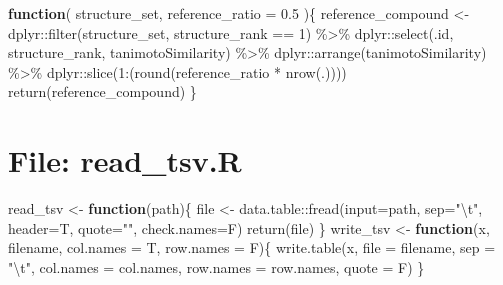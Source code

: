 \documentclass[
]{article}
\newenvironment{Shaded}{\begin{snugshade}}{\end{snugshade}}
\newcommand{\AttributeTok}[1]{\textcolor[rgb]{0.77,0.63,0.00}{#1}}
\newcommand{\ControlFlowTok}[1]{\textcolor[rgb]{0.13,0.29,0.53}{\textbf{#1}}}
\newcommand{\DecValTok}[1]{\textcolor[rgb]{0.00,0.00,0.81}{#1}}
\newcommand{\FloatTok}[1]{\textcolor[rgb]{0.00,0.00,0.81}{#1}}
\newcommand{\FunctionTok}[1]{\textcolor[rgb]{0.00,0.00,0.00}{#1}}
\newcommand{\NormalTok}[1]{#1}
\newcommand{\OtherTok}[1]{\textcolor[rgb]{0.56,0.35,0.01}{#1}}
\newcommand{\SpecialCharTok}[1]{\textcolor[rgb]{0.00,0.00,0.00}{#1}}
\newcommand{\StringTok}[1]{\textcolor[rgb]{0.31,0.60,0.02}{#1}}
\begin{document}
\begin{Shaded}
\begin{Highlighting}[]
  \ControlFlowTok{function}\NormalTok{(}
\NormalTok{           structure\_set,}
           \AttributeTok{reference\_ratio =} \FloatTok{0.5}
\NormalTok{           )\{}
\NormalTok{    reference\_compound }\OtherTok{\textless{}{-}}\NormalTok{ dplyr}\SpecialCharTok{::}\FunctionTok{filter}\NormalTok{(structure\_set, structure\_rank }\SpecialCharTok{==} \DecValTok{1}\NormalTok{) }\SpecialCharTok{\%\textgreater{}\%} 
\NormalTok{      dplyr}\SpecialCharTok{::}\FunctionTok{select}\NormalTok{(.id, structure\_rank, tanimotoSimilarity) }\SpecialCharTok{\%\textgreater{}\%} 
\NormalTok{      dplyr}\SpecialCharTok{::}\FunctionTok{arrange}\NormalTok{(tanimotoSimilarity) }\SpecialCharTok{\%\textgreater{}\%} 
\NormalTok{      dplyr}\SpecialCharTok{::}\FunctionTok{slice}\NormalTok{(}\DecValTok{1}\SpecialCharTok{:}\NormalTok{(}\FunctionTok{round}\NormalTok{(reference\_ratio }\SpecialCharTok{*} \FunctionTok{nrow}\NormalTok{(.))))}
    \FunctionTok{return}\NormalTok{(reference\_compound)}
\NormalTok{  \}}
\end{Highlighting}
\end{Shaded}

\hypertarget{file-read_tsv.r}{%
\section{File: read\_tsv.R}\label{file-read_tsv.r}}

\begin{Shaded}
\begin{Highlighting}[]
\NormalTok{read\_tsv }\OtherTok{\textless{}{-}} \ControlFlowTok{function}\NormalTok{(path)\{}
\NormalTok{  file }\OtherTok{\textless{}{-}}\NormalTok{ data.table}\SpecialCharTok{::}\FunctionTok{fread}\NormalTok{(}\AttributeTok{input=}\NormalTok{path, }\AttributeTok{sep=}\StringTok{"}\SpecialCharTok{\textbackslash{}t}\StringTok{"}\NormalTok{, }\AttributeTok{header=}\NormalTok{T, }\AttributeTok{quote=}\StringTok{""}\NormalTok{, }\AttributeTok{check.names=}\NormalTok{F)}
  \FunctionTok{return}\NormalTok{(file)}
\NormalTok{\}}
\NormalTok{write\_tsv }\OtherTok{\textless{}{-}}
  \ControlFlowTok{function}\NormalTok{(x, filename, }\AttributeTok{col.names =}\NormalTok{ T, }\AttributeTok{row.names =}\NormalTok{ F)\{}
    \FunctionTok{write.table}\NormalTok{(x, }\AttributeTok{file =}\NormalTok{ filename, }\AttributeTok{sep =} \StringTok{"}\SpecialCharTok{\textbackslash{}t}\StringTok{"}\NormalTok{, }\AttributeTok{col.names =}\NormalTok{ col.names, }\AttributeTok{row.names =}\NormalTok{ row.names, }\AttributeTok{quote =}\NormalTok{ F)}
\NormalTok{  \}}
\end{Highlighting}
\end{Shaded}
\end{document}

